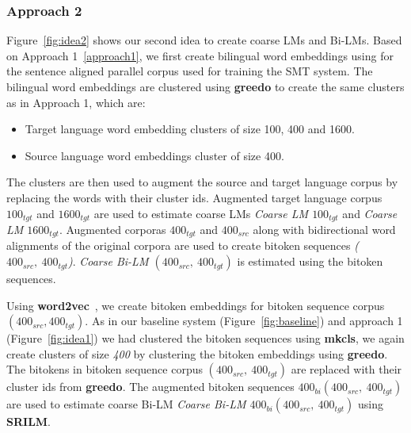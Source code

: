 \subsubsection{Approach 2}\label{approach2}
Figure~\ref{fig:idea2} shows our second idea to create coarse LMs and Bi-LMs. Based on Approach 1~\ref{approach1}, we first create bilingual word embeddings using \cite{Hermann14} for the sentence aligned parallel corpus used for training the SMT system. The bilingual word embeddings are clustered using \textbf{greedo} to create the same clusters as in Approach 1, which are:
\begin{itemize}
	\item Target language word embedding clusters of size 100, 400 and 1600.
	\item Source language word embeddings cluster of size 400.
\end{itemize}

The clusters are then used to augment the source and target language corpus by replacing the words with their cluster ids. Augmented target language corpus \textit{$100_{tgt}$} and \textit{$1600_{tgt}$} are used to estimate coarse LMs \textit{Coarse LM $100_{tgt}$} and \textit{Coarse LM $1600_{tgt}$}. Augmented corporas \textit{$400_{tgt}$} and \textit{$400_{src}$} along with bidirectional word alignments of the original corpora are used to create bitoken sequences \textit{($400_{src},\ 400_{tgt}$)}. \textit{Coarse Bi-LM $(400_{src},\ 400_{tgt})$} is estimated using the bitoken sequences.

Using \textbf{word2vec}~\cite{Mikolov2013a}, we create bitoken embeddings for bitoken sequence corpus \textit{$(400_{src}, 400_{tgt})$}. As in our baseline system (Figure~\ref{fig:baseline}) and approach 1 (Figure~\ref{fig:idea1}) we had clustered the bitoken sequences using \textbf{mkcls}, we again create clusters of size \textit{400} by clustering the bitoken embeddings using \textbf{greedo}. The bitokens in bitoken sequence corpus \textit{$(400_{src},\ 400_{tgt})$} are replaced with their cluster ids from \textbf{greedo}. The augmented bitoken sequences \textit{$400_{bi}(400_{src},\ 400_{tgt})$} are used to estimate coarse Bi-LM \textit{Coarse Bi-LM $400_{bi}(400_{src},\ 400_{tgt})$} using \textbf{SRILM}.

